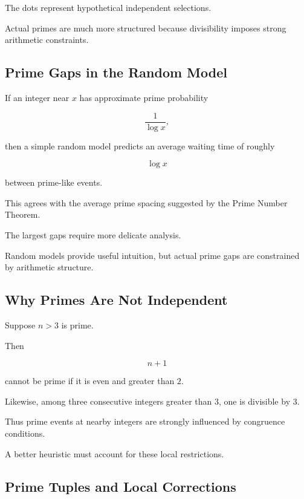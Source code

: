 The dots represent hypothetical independent selections.

Actual primes are much more structured because divisibility imposes strong
arithmetic constraints.

\subsection{Prime Gaps in the Random Model}
\label{subsec:prime-gaps-random-model}

If an integer near \(x\) has approximate prime probability

\[ \frac1{\log x}, \]

then a simple random model predicts an average waiting time of roughly

\[ \log x \]

between prime-like events.

This agrees with the average prime spacing suggested by the Prime Number
Theorem.

The largest gaps require more delicate analysis.

Random models provide useful intuition, but actual prime gaps are constrained
by arithmetic structure.

\subsection{Why Primes Are Not Independent}
\label{subsec:primes-not-independent}

Suppose \(n>3\) is prime.

Then

\[ n+1 \]

cannot be prime if it is even and greater than \(2\).

Likewise, among three consecutive integers greater than \(3\), one is
divisible by \(3\).

Thus prime events at nearby integers are strongly influenced by congruence
conditions.

A better heuristic must account for these local restrictions.

\subsection{Prime Tuples and Local Corrections}
\label{subsec:prime-tuples-local-corrections}

